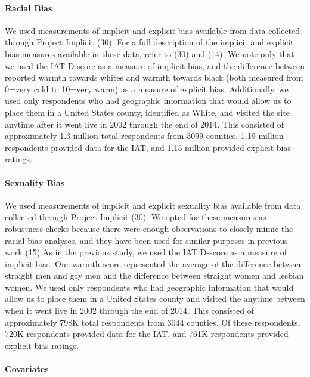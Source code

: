 \documentclass[9pt,twocolumn,twoside,lineno]{pnas-new}
\begin{document}
\paragraph{Racial Bias}\label{racial-bias}

We used measurements of implicit and explicit bias available from data
collected through Project Implicit (30). For a full description of the
implicit and explicit bias measures available in these data, refer to
(30) and (14). We note only that we used the IAT D-score as a measure of
implicit bias, and the difference between reported warmth towards whites
and warmth towards black (both measured from 0=very cold to 10=very
warm) as a measure of explicit bias. Additionally, we used only
respondents who had geographic information that would allow us to place
them in a United States county, identified as White, and visited the
site anytime after it went live in 2002 through the end of 2014. This
consisted of approximately 1.3 million total respondents from 3099
counties. 1.19 million respondents provided data for the IAT, and 1.15
million provided explicit bias ratings.

\paragraph{Sexuality Bias}\label{sexuality-bias}

We used measurements of implicit and explicit sexuality bias available
from data collected through Project Implicit (30). We opted for these
measures as robustness checks because there were enough observations to
closely mimic the racial bias analyses, and they have been used for
similar purposes in previous work (15) As in the previous study, we used
the IAT D-score as a measure of implicit bias. Our warmth score
represented the average of the difference between straight men and gay
men and the difference between straight women and lesbian women. We used
only respondents who had geographic information that would allow us to
place them in a United States county and visited the anytime between
when it went live in 2002 through the end of 2014. This consisted of
approximately 798K total respondents from 3044 counties. Of these
respondents, 720K respondents provided data for the IAT, and 761K
respondents provided explicit bias ratings.

\paragraph{Covariates}\label{covariates}
\end{document}
